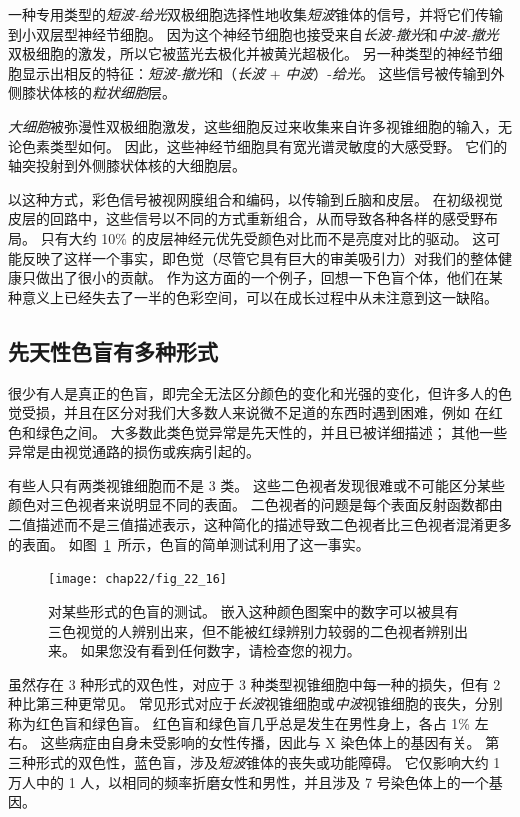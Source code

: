 一种专用类型的\textit{短波-给光}双极细胞选择性地收集\textit{短波}锥体的信号，并将它们传输到小双层型神经节细胞。
因为这个神经节细胞也接受来自\textit{长波-撤光}和\textit{中波-撤光}双极细胞的激发，所以它被蓝光去极化并被黄光超极化。
另一种类型的神经节细胞显示出相反的特征：\textit{短波-撤光}和（\textit{长波} + \textit{中波}）-\textit{给光}。
这些信号被传输到外侧膝状体核的\textit{粒状细胞}层。


\textit{大细胞}被弥漫性双极细胞激发，这些细胞反过来收集来自许多视锥细胞的输入，无论色素类型如何。
因此，这些神经节细胞具有宽光谱灵敏度的大感受野。
它们的轴突投射到外侧膝状体核的大细胞层。


以这种方式，彩色信号被视网膜组合和编码，以传输到丘脑和皮层。
在初级视觉皮层的回路中，这些信号以不同的方式重新组合，从而导致各种各样的感受野布局。
只有大约 10\% 的皮层神经元优先受颜色对比而不是亮度对比的驱动。
这可能反映了这样一个事实，即色觉（尽管它具有巨大的审美吸引力）对我们的整体健康只做出了很小的贡献。
作为这方面的一个例子，回想一下色盲个体，他们在某种意义上已经失去了一半的色彩空间，可以在成长过程中从未注意到这一缺陷。



\subsection{先天性色盲有多种形式}

很少有人是真正的色盲，即完全无法区分颜色的变化和光强的变化，但许多人的色觉受损，并且在区分对我们大多数人来说微不足道的东西时遇到困难，例如 在红色和绿色之间。
大多数此类色觉异常是先天性的，并且已被详细描述；
其他一些异常是由视觉通路的损伤或疾病引起的。


有些人只有两类视锥细胞而不是 3 类。
这些二色视者发现很难或不可能区分某些颜色对三色视者来说明显不同的表面。
二色视者的问题是每个表面反射函数都由二值描述而不是三值描述表示，这种简化的描述导致二色视者比三色视者混淆更多的表面。
如图~\ref{fig:22_16}~所示，色盲的简单测试利用了这一事实。


\begin{figure}[htbp]
	\centering
	\texttt{[image: chap22/fig\_22\_16]}
	\caption{对某些形式的色盲的测试。 
		嵌入这种颜色图案中的数字可以被具有三色视觉的人辨别出来，但不能被红绿辨别力较弱的二色视者辨别出来。 
		如果您没有看到任何数字，请检查您的视力。}
	\label{fig:22_16}
\end{figure}


虽然存在 3 种形式的双色性，对应于 3 种类型视锥细胞中每一种的损失，但有 2 种比第三种更常见。
常见形式对应于\textit{长波}视锥细胞或\textit{中波}视锥细胞的丧失，分别称为红色盲和绿色盲。
红色盲和绿色盲几乎总是发生在男性身上，各占 1\% 左右。
这些病症由自身未受影响的女性传播，因此与 X 染色体上的基因有关。
第三种形式的双色性，蓝色盲，涉及\textit{短波}锥体的丧失或功能障碍。
它仅影响大约 1 万人中的 1 人，以相同的频率折磨女性和男性，并且涉及 7 号染色体上的一个基因。


